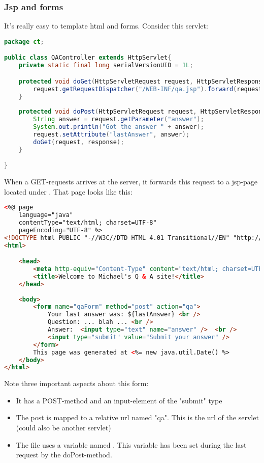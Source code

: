 \subsubsection{Jsp and forms}

It's really easy to template html and forms. Consider this servlet: 

\begin{lstlisting}[language=java]
package ct;

public class QAController extends HttpServlet{
	private static final long serialVersionUID = 1L;

	protected void doGet(HttpServletRequest request, HttpServletResponse response) throws ServletException, IOException {
	    request.getRequestDispatcher("/WEB-INF/qa.jsp").forward(request, response);
	}
	
	protected void doPost(HttpServletRequest request, HttpServletResponse response) throws ServletException, IOException {
		String answer = request.getParameter("answer");
		System.out.println("Got the answer " + answer);
		request.setAttribute("lastAnswer", answer);
		doGet(request, response);
	}

}
\end{lstlisting}

When a GET-requests arrives  at the server, it forwards this request to a jsp-page located under . That page looks like this: 

\begin{lstlisting}[language=html]
<%@ page 
	language="java" 
	contentType="text/html; charset=UTF-8"
	pageEncoding="UTF-8" %>
<!DOCTYPE html PUBLIC "-//W3C//DTD HTML 4.01 Transitional//EN" "http://www.w3.org/TR/html4/loose.dtd">
<html>

	<head>
		<meta http-equiv="Content-Type" content="text/html; charset=UTF-8">
		<title>Welcome to Michael's Q & A site!</title>
	</head>
	
	<body>
		<form name="qaForm" method="post" action="qa">
			Your last answer was: ${lastAnswer} <br />
			Question: ... blah ... <br /> 
			Answer:  <input type="text" name="answer" />  <br /> 
			<input type="submit" value="Submit your answer" />
		</form>
		This page was generated at <%= new java.util.Date() %>
	</body>
</html>
\end{lstlisting}

Note three important aspects about this form: 
\begin{itemize}
    \item It has a POST-method and an input-element of the "submit" type
    \item The post is mapped to a relative url named "qa". This is the url of the servlet (could also be another servlet)
    \item The file uses a variable named . This variable has been set during the last request by the doPost-method. 
\end{itemize}




